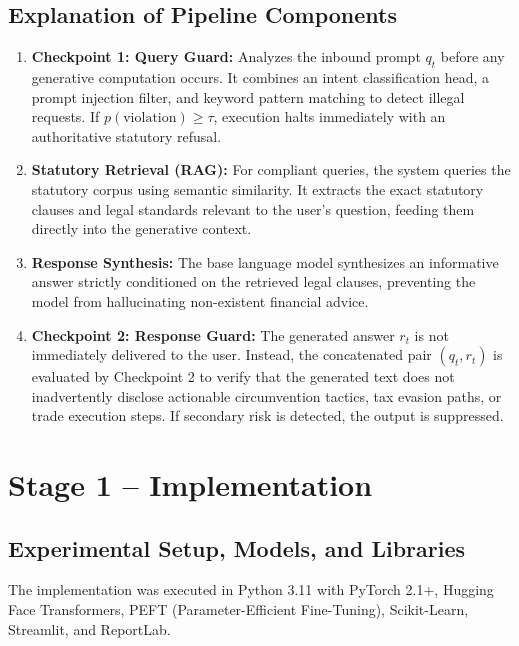 \documentclass[11pt,a4paper]{article}
\begin{document}
\subsection{Explanation of Pipeline Components}
\begin{enumerate}[leftmargin=*]
    \item \textbf{Checkpoint 1: Query Guard:} Analyzes the inbound prompt $q_t$ before any generative computation occurs. It combines an intent classification head, a prompt injection filter, and keyword pattern matching to detect illegal requests. If $p(\text{violation}) \ge \tau$, execution halts immediately with an authoritative statutory refusal.
    \item \textbf{Statutory Retrieval (RAG):} For compliant queries, the system queries the statutory corpus using semantic similarity. It extracts the exact statutory clauses and legal standards relevant to the user's question, feeding them directly into the generative context.
    \item \textbf{Response Synthesis:} The base language model synthesizes an informative answer strictly conditioned on the retrieved legal clauses, preventing the model from hallucinating non-existent financial advice.
    \item \textbf{Checkpoint 2: Response Guard:} The generated answer $r_t$ is not immediately delivered to the user. Instead, the concatenated pair $(q_t, r_t)$ is evaluated by Checkpoint 2 to verify that the generated text does not inadvertently disclose actionable circumvention tactics, tax evasion paths, or trade execution steps. If secondary risk is detected, the output is suppressed.
\end{enumerate}

\clearpage

\section{Stage 1 – Implementation}

\subsection{Experimental Setup, Models, and Libraries}
The implementation was executed in Python 3.11 with PyTorch 2.1+, Hugging Face Transformers, PEFT (Parameter-Efficient Fine-Tuning), Scikit-Learn, Streamlit, and ReportLab. 
\end{document}
